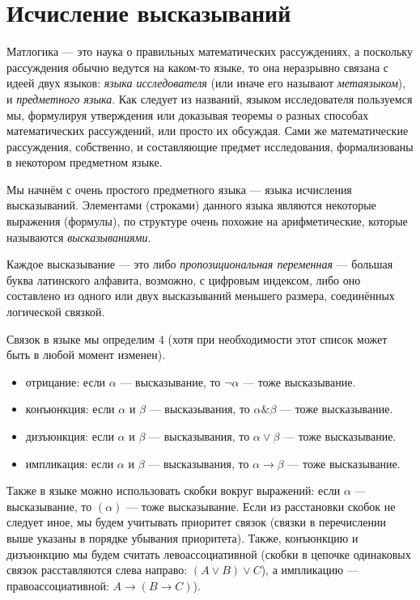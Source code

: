 \section{Исчисление высказываний}

Матлогика --- это наука о правильных математических рассуждениях, а поскольку
рассуждения обычно ведутся на каком-то языке, то она неразрывно связана с идеей
двух языков: \emph{языка исследователя} (или иначе его называют \emph{метаязыком}),
и \emph{предметного языка}. Как следует из названий, языком исследователя 
пользуемся мы, формулируя утверждения или доказывая теоремы о разных способах
математических рассуждений, или просто их обсуждая. Сами же математические рассуждения,
собственно, и составляющие предмет исследования, формализованы в некотором предметном 
языке.

Мы начнём с очень простого предметного языка --- языка исчисления высказываний.
Элементами (строками) данного языка являются некоторые выражения (формулы), по структуре
очень похожие на арифметические, которые называются \emph{высказываниями}.

Каждое высказывание --- это либо \emph{пропозициональная переменная} --- 
большая буква латинского алфавита, возможно, с цифровым индексом, либо 
оно составлено из одного или двух высказываний меньшего размера, соединённых логической связкой.

Связок в языке мы определим 4 (хотя при необходимости этот список может быть
в любой момент изменен).
\begin{itemize}
\item отрицание: если $\alpha$ --- высказывание, то $\neg\alpha$ --- тоже высказывание.
\item конъюнкция: если $\alpha$ и $\beta$ --- высказывания, то $\alpha \& \beta$ --- тоже высказывание.
\item дизъюнкция: если $\alpha$ и $\beta$ --- высказывания, то $\alpha \vee \beta$ --- тоже высказывание.
\item импликация: если $\alpha$ и $\beta$ --- высказывания, то $\alpha \rightarrow \beta$ --- тоже высказывание.
\end{itemize}

Также в языке можно использовать скобки вокруг выражений:
если $\alpha$ --- высказывание, то $(\alpha)$ --- тоже высказывание.
Если из расстановки скобок не следует иное, мы будем учитывать приоритет связок
(связки в перечислении выше указаны в порядке убывания приоритета).
Также, конъюнкцию и дизъюнкцию мы будем считать левоассоциативной (скобки в цепочке
одинаковых связок расставляются слева направо: $(A \vee B) \vee C$), 
а импликацию --- правоассоциативной: $A \rightarrow (B \rightarrow C)$). 

